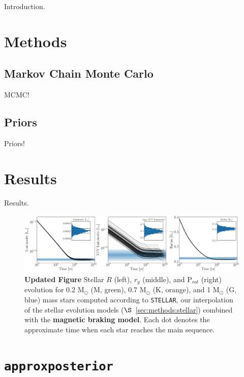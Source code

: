 \documentclass[twocolumn]{aastex62}
\newcommand{\xxx}[1]{{\textbf{#1}}}
\newcommand{\approxposterior}[0]{\texttt{approxposterior}\xspace}
\newcommand{\stellar}[0]{\texttt{STELLAR}\xspace}
\begin{document}
Introduction.


\section{Methods} \label{sec:methods}

\subsection{Markov Chain Monte Carlo} \label{sec:methods:mcmc}

MCMC!

\subsection{Priors} \label{sec:methods:priors}

Priors!


\section{Results} \label{sec:results}

Results.

\begin{figure}[ht]
	\includegraphics[width=\textwidth]{../Analysis/Evol/trappist1Evol.pdf}
   \caption{\xxx{Updated Figure} Stellar $R$ (left), $r_g$ (middle), and P$_{rot}$ (right) evolution for 0.2 M$_{\odot}$ (M, green), 0.7 M$_{\odot}$ (K, orange), and 1 M$_{\odot}$ (G, blue) mass stars computed according to \stellar, our interpolation of the \citet{Baraffe2015} stellar evolution models ($\S$~\ref{sec:methods:stellar}) combined with the \xxx{\citet{Matt2015} magnetic braking model}. Each dot denotes the approximate time when each star reaches the main sequence.}%
    \label{fig:stellarExample}%
\end{figure}


\section{\approxposterior} \label{sec:approx}
\end{document}
